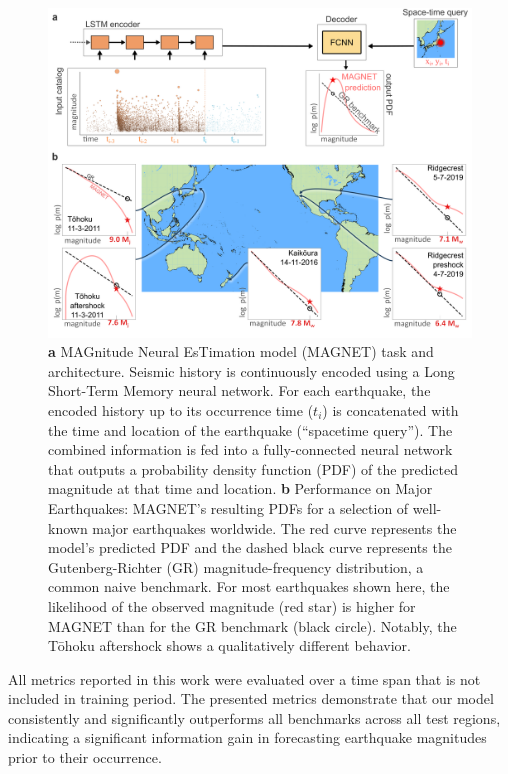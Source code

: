 \documentclass[pdflatex]{sn-jnl}
\begin{document}
\begin{figure}[h!]
	\centering
        \includegraphics[width=1\textwidth]{figures/intro_fig.png}
	\caption{\textbf{a} MAGnitude Neural EsTimation model (MAGNET) task and architecture. Seismic history is continuously encoded using a Long Short-Term Memory neural network. For each earthquake, the encoded history up to its occurrence time ($t_i$) is concatenated with the time and location of the earthquake (``spacetime query''). The combined information is fed into a fully-connected neural network that outputs a probability density function (PDF) of the predicted magnitude at that time and location. \textbf{b} Performance on Major Earthquakes: MAGNET's resulting PDFs for a selection of well-known major earthquakes worldwide. The red curve represents the model's predicted PDF and the dashed black curve represents the Gutenberg-Richter (GR) magnitude-frequency distribution, a common naive benchmark. For most earthquakes shown here, the likelihood of the observed magnitude (red star) is higher for MAGNET than for the GR benchmark (black circle). Notably, the Tōhoku aftershock shows a qualitatively different behavior.
    }
\label{fig:intro_fig}
\end{figure}

All metrics reported in this work were evaluated over a time span that is not included in training period. The presented metrics demonstrate that our model consistently and significantly outperforms all benchmarks across all test regions, indicating a significant information gain in forecasting earthquake magnitudes prior to their occurrence.
\end{document}
